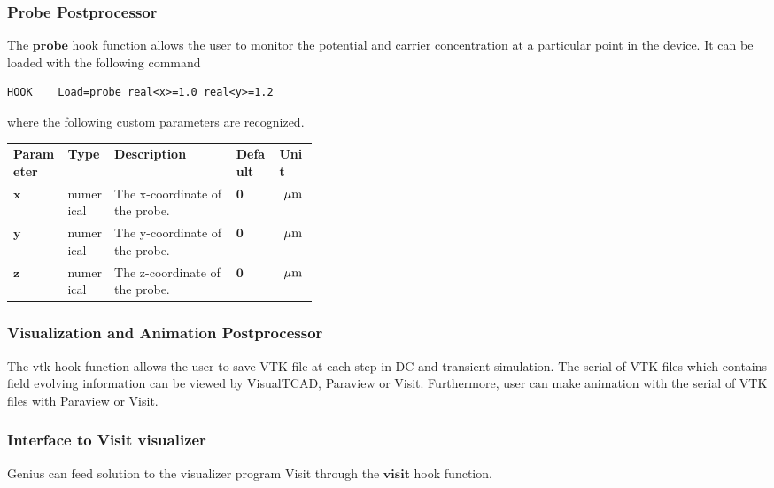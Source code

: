 \documentclass[oneside,12pt]{cgd_book}
\begin{document}
\subsubsection{Probe Postprocessor}
The $\mathbf{probe}$ hook function allows the user to monitor the potential and carrier
          concentration at a particular point in the device. It can be loaded with the following command
\begin{lstlisting}[style=GeniusCode]
HOOK    Load=probe real<x>=1.0 real<y>=1.2
\end{lstlisting}
where the following custom parameters are recognized.
\par
\begin{longtable}{ll>{\raggedright}p{0.4\linewidth}ll}
\textbf{Parameter} & \textbf{Type} & \textbf{Description} & \textbf{Default} & \textbf{Unit} \\
 $\mathbf{x}$
& numerical
& The x-coordinate of the probe.
& $\mathbf{0}$
& $~\mu \rm m$
\\
 $\mathbf{y}$
& numerical
& The y-coordinate of the probe.
& $\mathbf{0}$
& $~\mu \rm m$
\\
 $\mathbf{z}$
& numerical
& The z-coordinate of the probe.
& $\mathbf{0}$
& $~\mu \rm m$\\
\end{longtable}

\subsubsection{Visualization and Animation Postprocessor}
The vtk hook function allows the user to save VTK file at each step in DC and transient simulation. The
          serial of VTK files which contains field evolving information can be viewed by VisualTCAD, Paraview or Visit.
          Furthermore, user can make animation with the serial of VTK files with Paraview or Visit.
\par
\subsubsection{Interface to Visit visualizer}
Genius can feed solution to the visualizer program Visit through the
$\mathbf{visit}$ hook
          function.
\par
\end{document}
